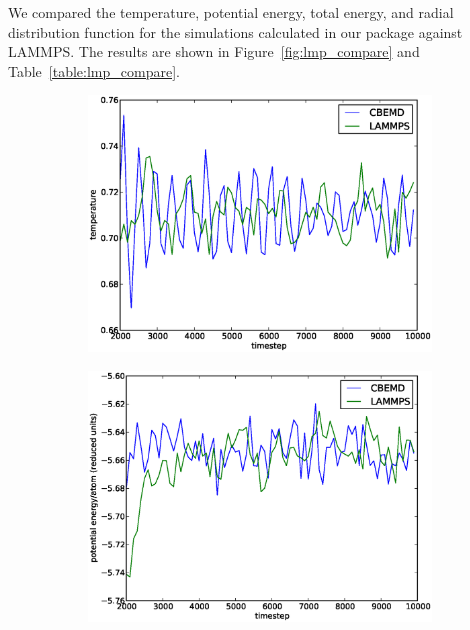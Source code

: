 \documentclass[12pt]{article}
\begin{document}
We compared the temperature, potential energy, total energy, and radial distribution function for the simulations calculated in our package against LAMMPS.
%
The results are shown in Figure~\ref{fig:lmp_compare} and Table~\ref{table:lmp_compare}.
%

\begin{figure}[H]
	\begin{subfigure}{0.5\textwidth}
    \includegraphics[width=\textwidth]{T_compare}
	\caption{}
	\end{subfigure}
	\begin{subfigure}{0.5\textwidth}
	\includegraphics[width=\textwidth]{PE_compare}
	\caption{}
	\end{subfigure}
	\begin{subfigure}{0.5\textwidth}

\end{subfigure}
\end{figure}
\end{document}
